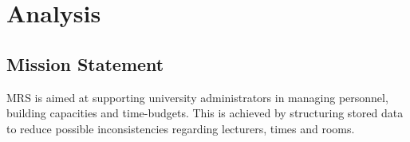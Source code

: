 \chapter{Analysis}
\section{Mission Statement}
MRS is aimed at supporting university administrators in managing personnel, building capacities and time-budgets.
This is achieved by structuring stored data to reduce possible inconsistencies regarding lecturers, times and rooms.
